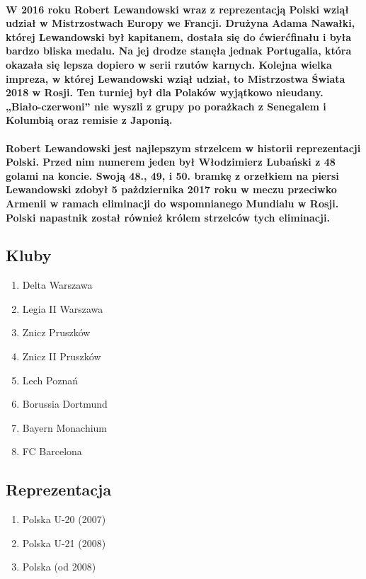 \documentclass[a4paper]{article}
\begin{document}
\paragraph{W 2016 roku Robert Lewandowski wraz z reprezentacją Polski wziął udział w Mistrzostwach Europy we Francji. Drużyna Adama Nawałki, której Lewandowski był kapitanem, dostała się do ćwierćfinału i była bardzo bliska medalu. Na jej drodze stanęła jednak Portugalia, która okazała się lepsza dopiero w serii rzutów karnych.
Kolejna wielka impreza, w której Lewandowski wziął udział, to Mistrzostwa Świata 2018 w Rosji. Ten turniej był dla Polaków wyjątkowo nieudany. „Biało-czerwoni” nie wyszli z grupy po porażkach z Senegalem i Kolumbią oraz remisie z Japonią.}
\paragraph{Robert Lewandowski jest najlepszym strzelcem w historii reprezentacji Polski. Przed nim numerem jeden był Włodzimierz Lubański z 48 golami na koncie. Swoją 48., 49, i 50. bramkę z orzełkiem na piersi Lewandowski zdobył 5 pażdziernika 2017 roku w meczu przeciwko Armenii w ramach eliminacji do wspomnianego Mundialu w Rosji. Polski napastnik został również królem strzelców tych eliminacji.}

\subsection{Kluby}
\begin{enumerate}
\item Delta Warszawa
\item Legia II Warszawa
\item Znicz Pruszków
\item Znicz II Pruszków
\item Lech Poznań
\item Borussia Dortmund
\item Bayern Monachium
\item FC Barcelona
\end{enumerate}

\subsection{Reprezentacja}
\begin{enumerate}
\item Polska U-20 (2007)
\item Polska U-21 (2008)
\item Polska (od 2008)
\end{enumerate}
\end{document}
